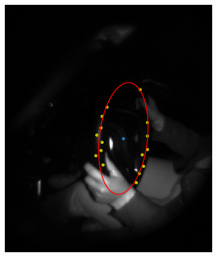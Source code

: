 \begin{figure}[ht]
    \centering
    \begin{subfigure}[t]{0.18\textwidth}
        \centering
        \includegraphics[width=\textwidth]{media/chapter 4/ellipse.png}
        \caption{}
        \label{fig:ellipse}
    \end{subfigure}\hfill
    \begin{subfigure}[t]{0.18\textwidth}
        \centering

\end{subfigure}
\end{figure}
